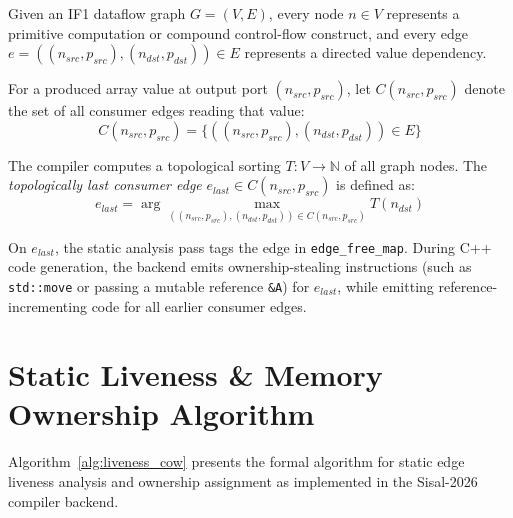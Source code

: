 Given an IF1 dataflow graph $G = (V, E)$, every node $n \in V$ represents a primitive computation or compound control-flow construct, and every edge $e = ((n_{src}, p_{src}), (n_{dst}, p_{dst})) \in E$ represents a directed value dependency.

For a produced array value at output port $(n_{src}, p_{src})$, let $C(n_{src}, p_{src})$ denote the set of all consumer edges reading that value:
\begin{equation}
C(n_{src}, p_{src}) = \{ ((n_{src}, p_{src}), (n_{dst}, p_{dst})) \in E \}
\end{equation}

The compiler computes a topological sorting $T : V \to \mathbb{N}$ of all graph nodes. The \emph{topologically last consumer edge} $e_{last} \in C(n_{src}, p_{src})$ is defined as:
\begin{equation}
e_{last} = \arg\max_{((n_{src}, p_{src}), (n_{dst}, p_{dst})) \in C(n_{src}, p_{src})} T(n_{dst})
\end{equation}

On $e_{last}$, the static analysis pass tags the edge in \texttt{edge\_free\_map}. During C++ code generation, the backend emits ownership-stealing instructions (such as \texttt{std::move} or passing a mutable reference \texttt{\&A}) for $e_{last}$, while emitting reference-incrementing code for all earlier consumer edges.

\section{Static Liveness \& Memory Ownership Algorithm}
Algorithm~\ref{alg:liveness_cow} presents the formal algorithm for static edge liveness analysis and ownership assignment as implemented in the Sisal-2026 compiler backend.

